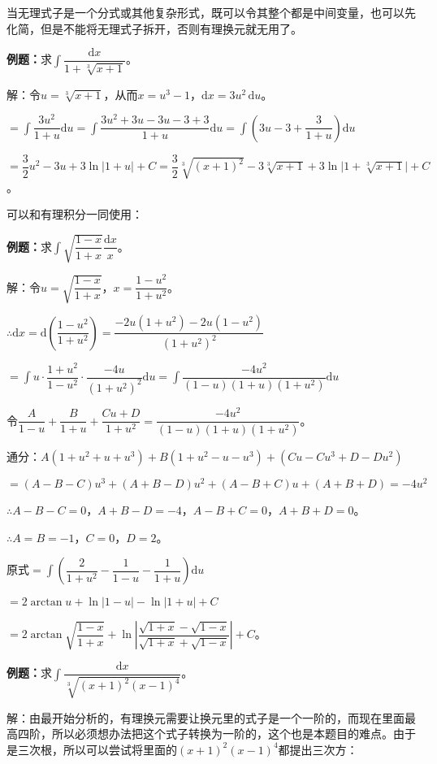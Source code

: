 \documentclass[UTF8, 12pt]{ctexart}
\begin{document}
当无理式子是一个分式或其他复杂形式，既可以令其整个都是中间变量，也可以先化简，但是不能将无理式子拆开，否则有理换元就无用了。

\textbf{例题：}求$\displaystyle{\int\dfrac{\textrm{d}x}{1+\sqrt[3]{x+1}}}$。

解：令$u=\sqrt[3]{x+1}$，从而$x=u^3-1$，$\textrm{d}x=3u^2\,\textrm{d}u$。

$=\displaystyle{\int\dfrac{3u^2}{1+u}\textrm{d}u=\int\dfrac{3u^2+3u-3u-3+3}{1+u}\textrm{d}u=\int\left(3u-3+\dfrac{3}{1+u}\right)\textrm{d}u}$

$=\dfrac{3}{2}u^2-3u+3\ln\vert1+u\vert+C=\dfrac{3}{2}\sqrt[3]{(x+1)^2}-3\sqrt[3]{x+1}+3\ln\vert1+\sqrt[3]{x+1}\vert+C$。

可以和有理积分一同使用：\medskip

\textbf{例题：}求$\displaystyle{\int\sqrt{\dfrac{1-x}{1+x}}\dfrac{\textrm{d}x}{x}}$。\medskip

解：令$u=\sqrt{\dfrac{1-x}{1+x}}$，$x=\dfrac{1-u^2}{1+u^2}$。

$\therefore\textrm{d}x=\textrm{d}\left(\dfrac{1-u^2}{1+u^2}\right)=\dfrac{-2u(1+u^2)-2u(1-u^2)}{(1+u^2)^2}$

$=\displaystyle{\int u\cdot\dfrac{1+u^2}{1-u^2}\cdot\dfrac{-4u}{(1+u^2)^2}\textrm{d}u=\int\dfrac{-4u^2}{(1-u)(1+u)(1+u^2)}\textrm{d}u}$

令$\dfrac{A}{1-u}+\dfrac{B}{1+u}+\dfrac{Cu+D}{1+u^2}=\dfrac{-4u^2}{(1-u)(1+u)(1+u^2)}$。

通分：$A(1+u^2+u+u^3)+B(1+u^2-u-u^3)+(Cu-Cu^3+D-Du^2)$

$=(A-B-C)u^3+(A+B-D)u^2+(A-B+C)u+(A+B+D)=-4u^2$

$\therefore A-B-C=0$，$A+B-D=-4$，$A-B+C=0$，$A+B+D=0$。

$\therefore A=B=-1$，$C=0$，$D=2$。

原式$=\displaystyle{\int\left(\dfrac{2}{1+u^2}-\dfrac{1}{1-u}-\dfrac{1}{1+u}\right)\textrm{d}u}$

$=2\arctan u+\ln\vert1-u\vert-\ln\vert1+u\vert+C$

$=2\arctan\sqrt{\dfrac{1-x}{1+x}}+\ln\left\vert\dfrac{\sqrt{1+x}-\sqrt{1-x}}{\sqrt{1+x}+\sqrt{1-x}}\right\vert+C$。

\textbf{例题：}求$\displaystyle{\int\dfrac{\textrm{d}x}{\sqrt[3]{(x+1)^2(x-1)^4}}}$。

解：由最开始分析的，有理换元需要让换元里的式子是一个一阶的，而现在里面最高四阶，所以必须想办法把这个式子转换为一阶的，这个也是本题目的难点。由于是三次根，所以可以尝试将里面的$(x+1)^2(x-1)^4$都提出三次方：
\end{document}
